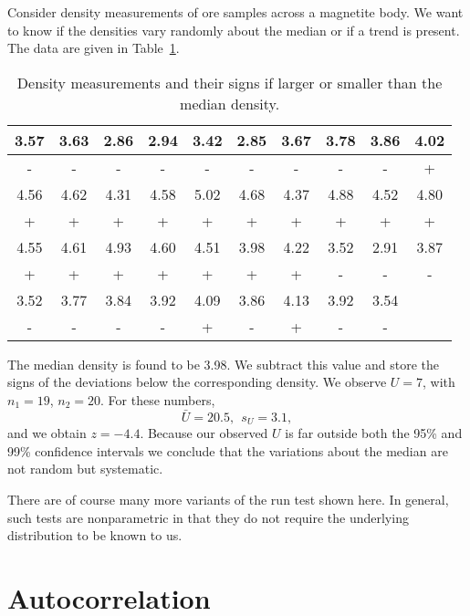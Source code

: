\begin{example}
Consider density measurements of ore samples across a magnetite body.  We 
want to know if the densities vary randomly about the median or if a trend is present.  The data 
are given in Table~\ref{tbl:runtest}.
\begin{table}[h]
\center
\begin{tabular}{|c|c|c|c|c|c|c|c|c|c|} \hline
3.57 & 3.63 & 2.86 & 2.94 & 3.42 & 2.85 & 3.67 & 3.78 & 3.86 & 4.02 \\ \hline
 -   &  -   &  -   &  -   &  -   &  -   &  -   &  -   &  -   &  +   \\ \hline
4.56 & 4.62 & 4.31 & 4.58 & 5.02 & 4.68 & 4.37 & 4.88 & 4.52 & 4.80 \\ \hline
 +   &  +   &  +   &  +   &  +   &  +   &  +   &  +   &  +   &  +   \\ \hline
4.55 & 4.61 & 4.93 & 4.60 & 4.51 & 3.98 & 4.22 & 3.52 & 2.91 & 3.87 \\ \hline
 +   &  +   &  +   &  +   &  +   &  +   &  +   &  -   &  -   &  -   \\ \hline
3.52 & 3.77 & 3.84 & 3.92 & 4.09 & 3.86 & 4.13 & 3.92 & 3.54 &      \\ \hline
 -   &  -   &  -   &  -   &  +   &  -   &  +   &  -   &  -   &      \\ \hline
\end{tabular}
\caption{Density measurements and their signs if larger or smaller than the median density.}
\label{tbl:runtest}
\end{table}
The median density is found to be 3.98.  We subtract this value and store the signs of the 
deviations below the corresponding density.  We observe $U = 7$, with $n_1 = 19$, $n_2 = 20$.  For these numbers, 
\begin{equation}
\bar{U} = 20.5, \ \ s_U = 3.1,
\end{equation}
and we obtain $z = -4.4$.  Because our observed $U$ is far outside both the 95\% and 99\% confidence intervals we conclude 
that the variations about the median are not random but systematic.
\end{example}
There are of course many 
more variants of the run test shown here.  In general, such tests are nonparametric in that they 
do not require the underlying distribution to be known to us.

\section{Autocorrelation}

